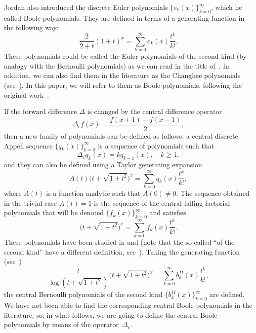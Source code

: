 \documentclass[11pt]{article}
\theoremstyle{plain}
\theoremstyle{remark}
\numberwithin{equation}{section} %
\begin{document}
Jordan \cite[\S\,113, p.~317]{Jor2} also introduced the discrete Euler polynomials $\{e_k(x)\}_{k=0}^{\infty}$, which he called Boole polynomials. 
They are defined in terms of a generating function in the following way:
\begin{equation}
\label{eq:fungenBoole}
  \frac{2}{2+t}(1+t)^x = \sum_{k=0}^{\infty} e_k(x)\frac{t^k}{k!}.
\end{equation} 
These polynomials could be called the Euler polynomials of the second kind (by analogy with the Bernoulli polynomials) as we can read in the title of~\cite{Car}.
In addition, we can also find them in the literature as the Changhee polynomials (see~\cite{KKS}). In this paper, we will refer to them as Boole polynomials, following the original work~\cite{Jor2}. 

If the forward difference $\Delta$ is changed by the central difference operator
\begin{equation*}
  \Delta_{\mathrm{c}} f(x) = \frac{f(x+1)-f(x-1)}{2},
\end{equation*}
then a new family of polynomials can be defined as follows: a central discrete Appell sequence $\{q_k(x)\}_{k=0}^{\infty}$ is a sequence of polynomials such that
\begin{equation*}
  \Delta_{\mathrm{c}}q_k(x) = kq_{k-1}(x),\quad k\ge 1,
\end{equation*}
and they can also be defined using a Taylor generating expansion
\begin{equation}
\label{eq:gen-cent}
  A(t)\big(t+\sqrt{1+t^2}\big)^x = \sum_{k=0}^{\infty} q_k(x) \frac{t^k}{k!},
\end{equation}
where $A(t)$ is a function analytic such that $A(0)\ne 0$. The sequence obtained in the trivial case $A(t)=1$ is the sequence of the central falling factorial polynomials that will be denoted $\{f_k(x)\}_{k=0}^{\infty}$ and satisfies
\begin{equation}
\label{eq:central}
  \big(t+\sqrt{1+t^2}\big)^x 
  = \sum_{k=0}^{\infty} f_k(x) \frac{t^k}{k!}.
\end{equation} 
These polynomials have been studied in \cite{Riordan} and \cite{LY} (note that the so-called ``of the second kind'' have a different definition, see~\cite{KK}). Taking the generating function (see~\cite[\S\,6]{Tem})
\begin{equation}
\label{eq:bkII}
  \frac{t}{\log(t+\sqrt{1+t^2})} \big(t+\sqrt{1+t^2}\big)^x 
  = \sum_{k=0}^{\infty} b_k^{\mathit{II}}(x) \frac{t^k}{k!},
\end{equation} 
the central Bernoulli polynomials of the second kind $\{b_k^{\mathit{II}}(x)\}_{k=0}^{\infty}$ are defined. We have not been able to find the corresponding central Boole polynomials in the literature, so, in what follows, we are going to define the central Boole polynomials by means of the operator~$\Delta_{\mathrm{c}}$.
\end{document}
